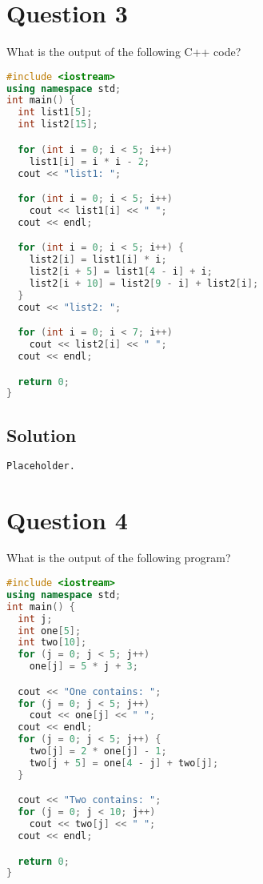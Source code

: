 \documentclass[a4paper, 11pt]{article}
\begin{document}
  \section{Question 3}
    What is the output of the following C++ code?

    \begin{lstlisting}[language=c++,caption={Question 3 Program}]
#include <iostream>
using namespace std;
int main() {
  int list1[5];
  int list2[15];

  for (int i = 0; i < 5; i++)
    list1[i] = i * i - 2;
  cout << "list1: ";

  for (int i = 0; i < 5; i++)
    cout << list1[i] << " ";
  cout << endl;

  for (int i = 0; i < 5; i++) {
    list2[i] = list1[i] * i;
    list2[i + 5] = list1[4 - i] + i;
    list2[i + 10] = list2[9 - i] + list2[i];
  }
  cout << "list2: ";

  for (int i = 0; i < 7; i++)
    cout << list2[i] << " ";
  cout << endl;

  return 0;
}
    \end{lstlisting}

    \subsection{Solution}
      \begin{lstlisting}[language=bash,caption={Question 3 Solution}]
Placeholder.
      \end{lstlisting}

    

  \newpage
  \section{Question 4}
    What is the output of the following program?
    
    \begin{lstlisting}[language=c++,caption={Question 4 Program}]
#include <iostream>
using namespace std;
int main() {
  int j;
  int one[5];
  int two[10];
  for (j = 0; j < 5; j++)
    one[j] = 5 * j + 3;

  cout << "One contains: ";
  for (j = 0; j < 5; j++)
    cout << one[j] << " ";
  cout << endl;
  for (j = 0; j < 5; j++) {
    two[j] = 2 * one[j] - 1;
    two[j + 5] = one[4 - j] + two[j];
  }

  cout << "Two contains: ";
  for (j = 0; j < 10; j++)
    cout << two[j] << " ";
  cout << endl;

  return 0;
}
    \end{lstlisting}
    
\end{document}
